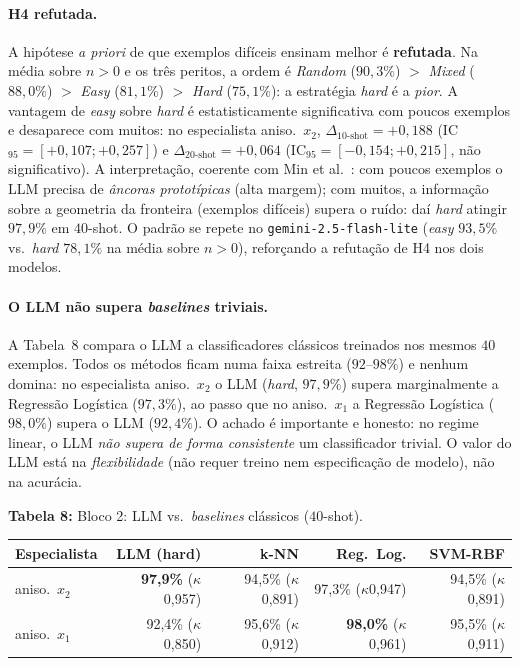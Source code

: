 \documentclass[12pt,a4paper]{article}
\begin{document}
\bigskip


\paragraph{H4 refutada.}
A hipótese \emph{a priori} de que exemplos difíceis ensinam melhor é \textbf{refutada}. Na
média sobre $n>0$ e os três peritos, a ordem é \emph{Random} ($90{,}3\%$) $>$ \emph{Mixed}
($88{,}0\%$) $>$ \emph{Easy} ($81{,}1\%$) $>$ \emph{Hard} ($75{,}1\%$): a estratégia
\emph{hard} é a \emph{pior}. A vantagem de \emph{easy} sobre \emph{hard} é estatisticamente
significativa com poucos exemplos e desaparece com muitos: no especialista aniso.\ $x_2$,
$\Delta_{10\text{-shot}} = +0{,}188$ (IC$_{95}=[+0{,}107;+0{,}257]$) e
$\Delta_{20\text{-shot}} = +0{,}064$ (IC$_{95}=[-0{,}154;+0{,}215]$, não significativo). A
interpretação, coerente com Min et al.~\cite{minRethinkingRole2022}: com poucos exemplos o
LLM precisa de \emph{âncoras prototípicas} (alta margem); com muitos, a informação sobre a
geometria da fronteira (exemplos difíceis) supera o ruído: daí \emph{hard} atingir $97{,}9\%$
em $40$-shot. O padrão se repete no \texttt{gemini-2.5-flash-lite} (\emph{easy} $93{,}5\%$
vs.\ \emph{hard} $78{,}1\%$ na média sobre $n>0$), reforçando a refutação de H4 nos dois
modelos.

\paragraph{O LLM não supera \emph{baselines} triviais.}
A Tabela~8 compara o LLM a classificadores clássicos treinados nos mesmos
$40$ exemplos. Todos os métodos ficam numa faixa estreita ($92$–$98\%$) e nenhum domina: no
especialista aniso.\ $x_2$ o LLM (\emph{hard}, $97{,}9\%$) supera marginalmente a Regressão
Logística ($97{,}3\%$), ao passo que no aniso.\ $x_1$ a Regressão Logística ($98{,}0\%$)
supera o LLM ($92{,}4\%$). O achado é importante e honesto: no regime linear, o LLM
\emph{não supera de forma consistente} um classificador trivial. O valor do LLM está na
\emph{flexibilidade} (não requer treino nem especificação de modelo), não na acurácia.


\bigskip

\noindent \textbf{Tabela 8:} Bloco 2: LLM vs.\ \emph{baselines} clássicos ($40$-shot).

\begin{tabular}{lrrrr}
\toprule
\textbf{Especialista} & \textbf{LLM (hard)} & \textbf{k-NN} &
\textbf{Reg.\ Log.} & \textbf{SVM-RBF} \\
\midrule
aniso.\ $x_2$ & \textbf{97,9\%} ($\kappa$0,957) & 94,5\% ($\kappa$0,891) &
  97,3\% ($\kappa$0,947) & 94,5\% ($\kappa$0,891) \\
aniso.\ $x_1$ & 92,4\% ($\kappa$0,850)         & 95,6\% ($\kappa$0,912)    &
  \textbf{98,0\%} ($\kappa$0,961) & 95,5\% ($\kappa$0,911) \\
\bottomrule
\end{tabular}
\end{document}

